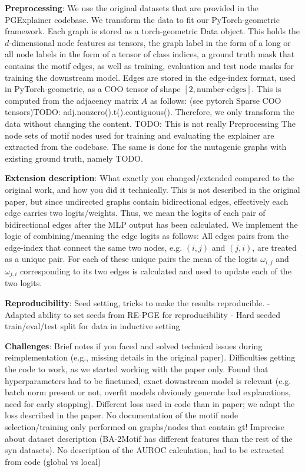 \textbf{Preprocessing}: We use the original datasets that are provided in the PGExplainer codebase. We transform the data to fit our PyTorch-geometric framework. Each graph is stored as a torch-geometric Data object. This holds the $d$-dimensional node features as tensors, the graph label in the form of a long or all node labels in the form of a tensor of class indices, a ground truth mask that contains the motif edges, as well as training, evaluation and test node masks for training the downstream model. Edges are stored in the edge-index format, used in PyTorch-geometric, as a COO tensor of shape $[2, \text{number-edges}]$. This is computed from the adjacency matrix $A$ as follows: (see pytorch Sparse COO tensors)TODO: adj.nonzero().t().contiguous(). Therefore, we only transform the data without changing the content.
TODO: This is not really Preprocessing
The node sets of motif nodes used for training and evaluating the explainer are extracted from the codebase. The same is done for the mutagenic graphs with existing ground truth, namely TODO.

\textbf{Extension description}: What exactly you changed/extended compared to the original work, and how you did it technically.
This is not described in the original paper, but since undirected graphs contain bidirectional edges, effectively each edge carries two logits/weights. Thus, we mean the logits of each pair of bidirectional edges after the MLP output has been calculated. We implement the logic of combining/meaning the edge logits as follows: All edges pairs from the edge-index that connect the same two nodes, e.g. $(i,j)$ and $(j,i)$, are treated as a unique pair. For each of these unique pairs the mean of the logits $\omega_{i,j}$ and $\omega_{j,i}$ corresponding to its two edges is calculated and used to update each of the two logits.

\textbf{Reproducibility}: Seed setting, tricks to make the results reproducible.
 - Adapted ability to set seeds from RE-PGE for reproducibility
 - Hard seeded train/eval/test split for data in inductive setting

\textbf{Challenges}: Brief notes if you faced and solved technical issues during reimplementation (e.g., missing details in the original paper). Difficulties getting the code to work, as we started working with the paper only. Found that hyperparameters had to be finetuned, exact downstream model is relevant (e.g. batch norm present or not, overfit models obviously generate bad explanations, need for early stopping). Different loss used in code than in paper; we adapt the loss described in the paper. No documentation of the motif node selection/training only performed on graphs/nodes that contain gt! Imprecise about dataset description (BA-2Motif has different features than the rest of the syn datasets). No description of the AUROC calculation, had to be extracted from code (global vs local)


